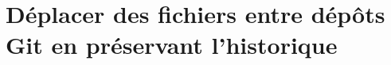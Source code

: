 \chapter{Déplacer des fichiers entre dépôts Git en préservant l'historique}
\label{deplacer-historique-depots}
